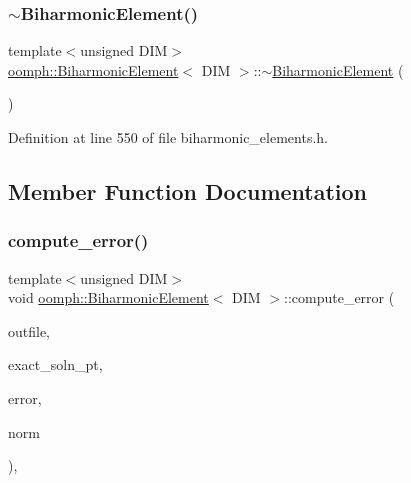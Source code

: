 \mbox{\label{classoomph_1_1BiharmonicElement_afa00029c6b72aec12a6dbc4d888c9144}} 
\subsubsection{\texorpdfstring{$\sim$\+Biharmonic\+Element()}{~BiharmonicElement()}}
{\footnotesize\ttfamily template$<$unsigned D\+IM$>$ \\
\hyperlink{classoomph_1_1BiharmonicElement}{oomph\+::\+Biharmonic\+Element}$<$ D\+IM $>$\+::$\sim$\hyperlink{classoomph_1_1BiharmonicElement}{Biharmonic\+Element} (\begin{DoxyParamCaption}{ }\end{DoxyParamCaption})\hspace{0.3cm}{\ttfamily [inline]}}



Definition at line 550 of file biharmonic\+\_\+elements.\+h.



\subsection{Member Function Documentation}
\mbox{\label{classoomph_1_1BiharmonicElement_a456d89dce0ecf60aafab33c035838581}} 
\subsubsection{\texorpdfstring{compute\+\_\+error()}{compute\_error()}\hspace{0.1cm}{\footnotesize\ttfamily [1/2]}}
{\footnotesize\ttfamily template$<$unsigned D\+IM$>$ \\
void \hyperlink{classoomph_1_1BiharmonicElement}{oomph\+::\+Biharmonic\+Element}$<$ D\+IM $>$\+::compute\+\_\+error (\begin{DoxyParamCaption}\item[{std\+::ostream \&}]{outfile,  }\item[{\hyperlink{classoomph_1_1FiniteElement_a690fd33af26cc3e84f39bba6d5a85202}{Finite\+Element\+::\+Steady\+Exact\+Solution\+Fct\+Pt}}]{exact\+\_\+soln\+\_\+pt,  }\item[{double \&}]{error,  }\item[{double \&}]{norm }\end{DoxyParamCaption})\hspace{0.3cm}{\ttfamily [inline]}, {\ttfamily [virtual]}}



